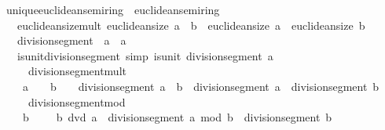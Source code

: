 \begin{isabellebody}
%
\isadelimdocument
%
\endisadelimdocument
%
\isatagdocument
%
\isamarkuptrue%
%
\endisatagdocument
{\isafolddocument}%
%
\isadelimdocument
%
\endisadelimdocument
{}\isamarkupfalse%
\ unique{\isacharunderscore}{\kern0pt}euclidean{\isacharunderscore}{\kern0pt}semiring\ {\isacharequal}{\kern0pt}\ euclidean{\isacharunderscore}{\kern0pt}semiring\ {\isacharplus}{\kern0pt}\ \isanewline
\ \ \ euclidean{\isacharunderscore}{\kern0pt}size{\isacharunderscore}{\kern0pt}mult{\isacharcolon}{\kern0pt}\ {\isachardoublequoteopen}euclidean{\isacharunderscore}{\kern0pt}size\ {\isacharparenleft}{\kern0pt}a\ {\isacharasterisk}{\kern0pt}\ b{\isacharparenright}{\kern0pt}\ {\isacharequal}{\kern0pt}\ euclidean{\isacharunderscore}{\kern0pt}size\ a\ {\isacharasterisk}{\kern0pt}\ euclidean{\isacharunderscore}{\kern0pt}size\ b{\isachardoublequoteclose}\isanewline
\ \ \ division{\isacharunderscore}{\kern0pt}segment\ {\isacharcolon}{\kern0pt}{\isacharcolon}{\kern0pt}\ {\isachardoublequoteopen}{\isacharprime}{\kern0pt}a\ {\isasymRightarrow}\ {\isacharprime}{\kern0pt}a{\isachardoublequoteclose}\isanewline
\ \ \ is{\isacharunderscore}{\kern0pt}unit{\isacharunderscore}{\kern0pt}division{\isacharunderscore}{\kern0pt}segment\ {\isacharbrackleft}{\kern0pt}simp{\isacharbrackright}{\kern0pt}{\isacharcolon}{\kern0pt}\ {\isachardoublequoteopen}is{\isacharunderscore}{\kern0pt}unit\ {\isacharparenleft}{\kern0pt}division{\isacharunderscore}{\kern0pt}segment\ a{\isacharparenright}{\kern0pt}{\isachardoublequoteclose}\isanewline
\ \ \ \ \ division{\isacharunderscore}{\kern0pt}segment{\isacharunderscore}{\kern0pt}mult{\isacharcolon}{\kern0pt}\isanewline
\ \ \ \ {\isachardoublequoteopen}a\ {\isasymnoteq}\ {}\ {\isasymLongrightarrow}\ b\ {\isasymnoteq}\ {}\ {\isasymLongrightarrow}\ division{\isacharunderscore}{\kern0pt}segment\ {\isacharparenleft}{\kern0pt}a\ {\isacharasterisk}{\kern0pt}\ b{\isacharparenright}{\kern0pt}\ {\isacharequal}{\kern0pt}\ division{\isacharunderscore}{\kern0pt}segment\ a\ {\isacharasterisk}{\kern0pt}\ division{\isacharunderscore}{\kern0pt}segment\ b{\isachardoublequoteclose}\isanewline
\ \ \ \ \ division{\isacharunderscore}{\kern0pt}segment{\isacharunderscore}{\kern0pt}mod{\isacharcolon}{\kern0pt}\isanewline
\ \ \ \ {\isachardoublequoteopen}b\ {\isasymnoteq}\ {}\ {\isasymLongrightarrow}\ {\isasymnot}\ b\ dvd\ a\ {\isasymLongrightarrow}\ division{\isacharunderscore}{\kern0pt}segment\ {\isacharparenleft}{\kern0pt}a\ mod\ b{\isacharparenright}{\kern0pt}\ {\isacharequal}{\kern0pt}\ division{\isacharunderscore}{\kern0pt}segment\ b{\isachardoublequoteclose}\isanewline

\end{isabellebody}
